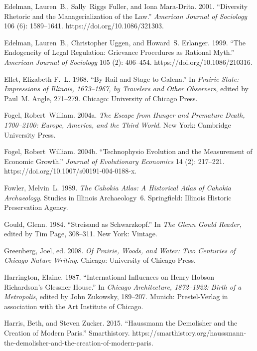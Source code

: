 \documentclass[]{interact}
\theoremstyle{plain}%
\theoremstyle{definition}
\theoremstyle{remark}
\begin{document}
\begin{thebibliography}{}
Edelman, Lauren~B., Sally~Riggs Fuller, and Iona Mara-Drita. 2001. ``Diversity
Rhetoric and the Managerialization of the Law.'' \emph{American Journal of
	Sociology} 106 (6): 1589--1641. https://doi.org/{10.1086/321303}.

Edelman, Lauren~B., Christopher Uggen, and Howard~S. Erlanger. 1999. ``The
Endogeneity of Legal Regulation: Grievance Procedures as Rational Myth.''
\emph{American Journal of Sociology} 105 (2): 406--454.
https://doi.org/{10.1086/210316}.

Ellet, Elizabeth F.~L. 1968. ``By Rail and Stage to Galena.'' In \emph{Prairie
	State: Impressions of {I}llinois, 1673--1967, by Travelers and Other
	Observers},  edited by Paul~M. Angle, 271--279. Chicago: University of
Chicago Press.

Fogel, Robert~William. 2004a. \emph{The Escape from Hunger and
	Premature Death, 1700--2100: {E}urope, {A}merica, and the {T}hird {W}orld}.
New York: Cambridge University Press.

Fogel, Robert~William. 2004b. ``Technophysio Evolution and the
Measurement of Economic Growth.'' \emph{Journal of Evolutionary Economics} 14
(2): 217--221. https://doi.org/{10.1007/s00191-004-0188-x}.

Fowler, Melvin~L. 1989. \emph{The {C}ahokia Atlas: A Historical Atlas of
	{C}ahokia Archaeology}. Studies in Illinois Archaeology~6. Springfield:
Illinois Historic Preservation Agency.

Gould, Glenn. 1984. ``Streisand as {S}chwarzkopf.'' In \emph{The {G}lenn
	{G}ould Reader},  edited by Tim Page, 308--311. New York: Vintage.

Greenberg, Joel, ed. 2008. \emph{Of Prairie, Woods, and Water: Two Centuries of
	{C}hicago Nature Writing}. Chicago: University of Chicago Press.

Harrington, Elaine. 1987. ``International Influences on {H}enry {H}obson
{R}ichardson's {G}lessner {H}ouse.'' In \emph{Chicago Architecture,
	1872--1922: Birth of a Metropolis},  edited by John Zukowsky, 189--207.
Munich: Prestel-Verlag in association with the Art Institute of Chicago.

Harris, Beth, and Steven Zucker. 2015. ``Haussmann the Demolisher and the
Creation of Modern Paris.'' Smarthistory.
{https://smarthistory.org/haussmann-the-demolisher-and-the-creation-of-modern-paris}.


\end{thebibliography}
\end{document}
